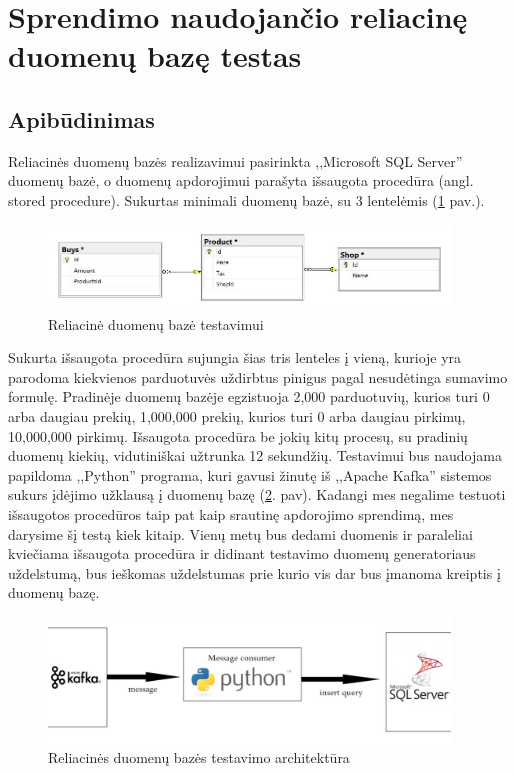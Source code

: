 \documentclass{VUMIFPSkursinis}
\begin{document}
\section{Sprendimo naudojančio reliacinę duomenų bazę testas}

\subsection{Apibūdinimas}

Reliacinės duomenų bazės realizavimui pasirinkta ,,Microsoft SQL Server'' duomenų bazė, o duomenų apdorojimui parašyta išsaugota procedūra (angl. stored procedure).
Sukurtas minimali duomenų bazė, su 3 lentelėmis (\ref{fig:dbdiagram} pav.).
\begin{figure}[!htbp]
    \centering
    \includegraphics[width=0.95\textwidth]{img/dbdiagram.jpg}
    \caption{Reliacinė duomenų bazė testavimui}
    \label{fig:dbdiagram}
\end{figure}

Sukurta išsaugota procedūra sujungia šias tris lenteles į vieną, kurioje yra parodoma kiekvienos parduotuvės uždirbtus pinigus pagal nesudėtinga sumavimo formulę.
Pradinėje duomenų bazėje egzistuoja 2,000 parduotuvių, kurios turi 0 arba daugiau prekių, 1,000,000 prekių, kurios turi 0 arba daugiau pirkimų, 10,000,000 pirkimų.
Išsaugota procedūra be jokių kitų procesų, su pradinių duomenų kiekių, vidutiniškai užtrunka 12 sekundžių. Testavimui bus naudojama papildoma ,,Python'' programa,
kuri gavusi žinutę iš ,,Apache Kafka'' sistemos sukurs įdėjimo užklausą į duomenų bazę (\ref{fig:generator}. pav). Kadangi mes negalime testuoti išsaugotos procedūros taip 
pat kaip srautinę apdorojimo sprendimą, mes darysime šį testą kiek kitaip. Vienų metų bus dedami duomenis ir paraleliai kviečiama išsaugota procedūra ir didinant 
testavimo duomenų generatoriaus uždelstumą, bus ieškomas uždelstumas prie kurio vis dar bus įmanoma kreiptis į duomenų bazę.

\begin{figure}[!htbp]
    \centering
    \includegraphics[width=0.95\textwidth]{img/dbms2.jpg}
    \caption{Reliacinės duomenų bazės testavimo architektūra}
    \label{fig:generator}
\end{figure}
\end{document}
